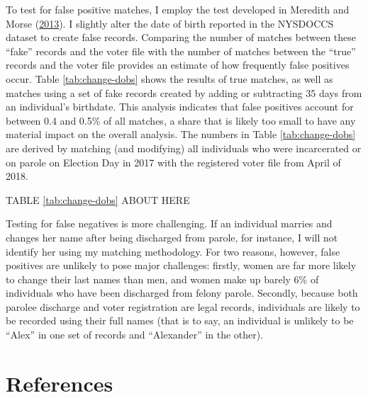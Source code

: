 \documentclass[
  12pt,
]{article}
\begin{document}
To test for false positive matches, I employ the test developed in Meredith and Morse (\protect\hyperlink{ref-Meredith2013}{2013}). I slightly alter the date of birth reported in the NYSDOCCS dataset to create false records. Comparing the number of matches between these ``fake'' records and the voter file with the number of matches between the ``true'' records and the voter file provides an estimate of how frequently false positives occur. Table \ref{tab:change-dobs} shows the results of true matches, as well as matches using a set of fake records created by adding or subtracting 35 days from an individual's birthdate. This analysis indicates that false positives account for between 0.4 and 0.5\% of all matches, a share that is likely too small to have any material impact on the overall analysis. The numbers in Table \ref{tab:change-dobs} are derived by matching (and modifying) all individuals who were incarcerated or on parole on Election Day in 2017 with the registered voter file from April of 2018.

TABLE \ref{tab:change-dobs} ABOUT HERE

Testing for false negatives is more challenging. If an individual marries and changes her name after being discharged from parole, for instance, I will not identify her using my matching methodology. For two reasons, however, false positives are unlikely to pose major challenges: firstly, women are far more likely to change their last names than men, and women make up barely 6\% of individuals who have been discharged from felony parole. Secondly, because both parolee discharge and voter registration are legal records, individuals are likely to be recorded using their full names (that is to say, an individual is unlikely to be ``Alex'' in one set of records and ``Alexander'' in the other).

\theendnotes

\newpage

\hypertarget{references}{%
\section*{References}\label{references}}
\end{document}
